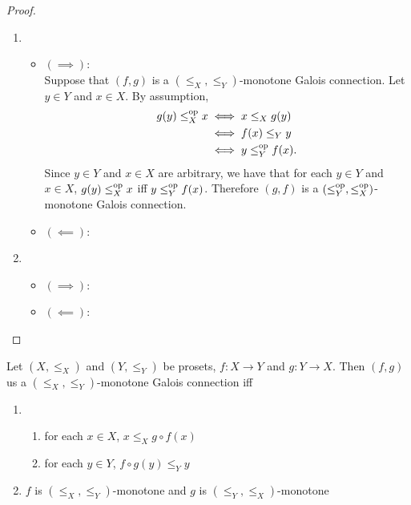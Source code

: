 \documentclass{book}
\begin{document}
	\begin{proof}\
		\begin{enumerate}
			\item 
			\begin{itemize}
				\item $(\implies)$: \\
				Suppose that $(f,g)$ is a $(\leq_X, \leq_Y)$-monotone Galois connection. Let $y \in Y$ and $x \in X$. By assumption, 
				\begin{align*}
					g(y) \leq^{\text{op}}_X x
					& \iff x \leq_X g(y) \\
					& \iff f(x) \leq_Y y \\
					& \iff y \leq^{\text{op}}_Y f(x).
				\end{align*}
				Since $y \in Y$ and $x \in X$ are arbitrary, we have that for each $y \in Y$ and $x \in X$, $g(y) \leq^{\text{op}}_X x$ iff $y \leq^{\text{op}}_Y f(x)$. Therefore $(g,f)$ is a $(\leq^{\text{op}}_Y, \leq^{\text{op}}_X)$-monotone Galois connection.
				\item $(\impliedby)$: \\
				
			\end{itemize}
			\item 
			\begin{itemize}
				\item $(\implies)$: \\
				\item $(\impliedby)$: \\
				
			\end{itemize}
		\end{enumerate}
	\end{proof}
	
	\begin{ex}
		Let $(X, \leq_X)$ and $(Y, \leq_Y)$ be prosets, $f: X \rightarrow Y$ and $g:Y \rightarrow X$. Then $(f,g)$ us a $(\leq_X, \leq_Y)$-monotone Galois connection iff
		\begin{enumerate}
			\item 
			\begin{enumerate}
				\item for each $x \in X$, $x \leq_X g \circ f (x)$
				\item for each $y \in Y$, $f \circ g (y) \leq_Y y$
			\end{enumerate}
			\item $f$ is $(\leq_X, \leq_Y)$-monotone and $g$ is $(\leq_Y, \leq_X)$-monotone
		\end{enumerate}
	\end{ex}
	
\end{document}
